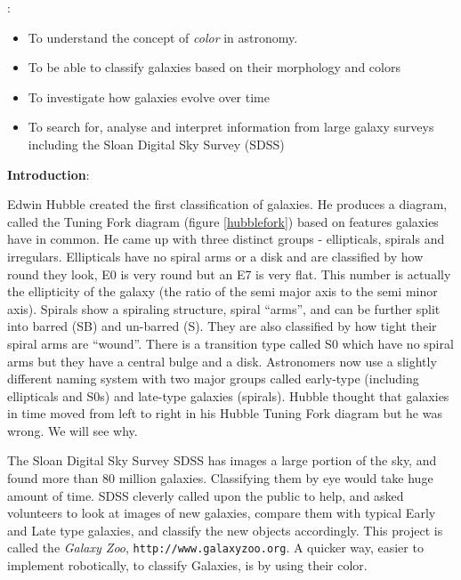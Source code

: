 
:
\begin{itemize}
\item To understand the concept of \emph{color} in astronomy.
\item  To be able to classify galaxies based on their morphology and colors
\item  To investigate how galaxies evolve over time
\item  To search for, analyse and interpret information from large galaxy surveys including the Sloan Digital Sky Survey (SDSS)
\end{itemize}

\noindent
{\bf  Introduction}:

\begin{figure*}[ht]
        \begin{center}{}
        \caption{Hubble’s famous Tuning Fork diagram created by Dr Karen Masters, based on an activity designed by Las Cumbres Observatory Global Telescope Network (LCOGT).}\label{hubblefork}
        \end{center}
                \end{figure*}

\noindent
Edwin Hubble created the first classification of galaxies. He produces a diagram, called the Tuning Fork diagram (figure \ref{hubblefork}) based on features galaxies have in common. He came up with three distinct groups - ellipticals, spirals and irregulars. Ellipticals have no spiral arms or a disk and are classified by how round they look, E0 is very round but an E7 is very flat. This number is actually the ellipticity of the galaxy (the ratio of the semi major axis to the semi minor axis). Spirals show a spiraling structure, spiral ``arms'', and can be further split into barred (SB) and un-barred (S). They are also classified by how tight their spiral arms are ``wound''. There is a transition type called S0 which have no spiral arms but they have a central bulge and a disk. Astronomers now use a slightly different naming system with two major groups called early-type (including ellipticals and S0s) and late-type galaxies (spirals). Hubble thought that galaxies in time moved from left to right in his Hubble Tuning Fork diagram but he was wrong. We will see why.


\noindent
The Sloan Digital Sky Survey SDSS has images a large portion of the sky, and found more than 80 million galaxies. Classifying them by eye would take huge amount of time. SDSS cleverly called upon the public to help, and asked volunteers to look at images of new galaxies, compare them with typical Early and Late type galaxies, and classify the new objects accordingly. This project is called the \emph{Galaxy Zoo}, {\tt http://www.galaxyzoo.org}. A quicker way, easier to implement robotically, to classify Galaxies, is by using their color. 

